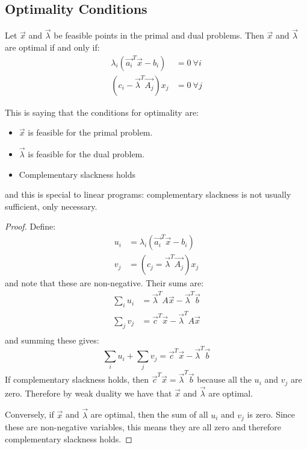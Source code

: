 \documentclass[../Main.tex]{subfiles}
\begin{document}
\subsection{Optimality Conditions}
\begin{theorem}
    Let $\vec{x}$ and $\vec{\lambda}$ be feasible points in the primal and dual problems. Then $\vec{x}$ and $\vec{\lambda}$ are optimal if and only if:
    \begin{align*}
        \lambda_i \left(\vec{a_i}^T \vec{x} - b_i\right) &= 0~\forall i \\
        \left(c_i - \vec{\lambda}^T \vec{A_j}\right)x_j &= 0~\forall j
    \end{align*}
    \label{thmLinearOptimality}
\end{theorem}
\begin{remark}
    This is saying that the conditions for optimality are:
    \begin{itemize}
        \item $\vec{x}$ is feasible for the primal problem.
        \item $\vec{\lambda}$ is feasible for the dual problem.
        \item Complementary slackness holds
    \end{itemize}
    and this is special to linear programs: complementary slackness is not usually sufficient, only necessary.
\end{remark}
\begin{proof}
    Define:
    \begin{align*}
        u_i &= \lambda_i \left(\vec{a_i}^T \vec{x} - b_i\right) \\
        v_j &= \left(c_j = \vec{\lambda}^T \vec{A_j}\right)x_j
    \end{align*}
    and note that these are non-negative. Their sums are:
    \begin{align*}
        \sum_i u_i &= \vec{\lambda}^T A \vec{x} - \vec{\lambda}^T \vec{b} \\
        \sum_j v_j &= \vec{c}^T \vec{x} - \vec{\lambda}^T A \vec{x} \\
    \end{align*}
    and summing these gives:
    \begin{equation*}
        \sum_i u_i + \sum_j v_j = \vec{c}^T \vec{x} - \vec{\lambda}^T \vec{b}
    \end{equation*}
    If complementary slackness holds, then $\vec{c}^T \vec{x} = \vec{\lambda}^T \vec{b}$ because all the $u_i$ and $v_j$ are zero. Therefore by weak duality we have that $\vec{x}$ and $\vec{\lambda}$ are optimal.

    Conversely, if $\vec{x}$ and $\vec{\lambda}$ are optimal, then the sum of all $u_i$ and $v_j$ is zero. Since these are non-negative variables, this means they are all zero and therefore complementary slackness holds.
\end{proof}
\end{document}
